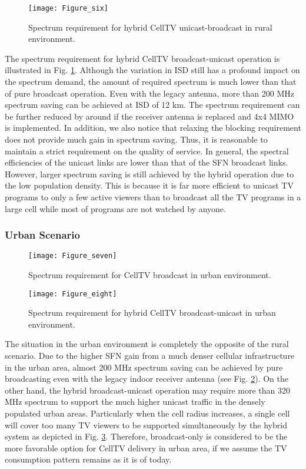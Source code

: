 \documentclass[journal]{IEEEtran}
\begin{document}
   \begin{figure}[t]
  \centering
  \texttt{[image: Figure\_six]}\\
  \caption{Spectrum requirement for hybrid CellTV unicast-broadcast in rural environment.}\label{fig:Hybrid_rural}
\end{figure}
The spectrum requirement for hybrid CellTV broadcast-unicast operation is illustrated in Fig. \ref{fig:Hybrid_rural}. Although the variation in ISD still has a profound impact on the spectrum demand, the amount of required spectrum is much lower than that of pure broadcast operation. Even with the legacy antenna, more than 200 MHz spectrum saving can be achieved at ISD of 12 km. The spectrum requirement can be further reduced by around  if the receiver antenna is replaced and 4x4 MIMO is implemented. In addition, we also notice that relaxing the blocking requirement does not provide much gain in spectrum saving. Thus, it is reasonable to maintain a strict requirement on the quality of service. In general, the spectral efficiencies of the unicast links are lower than that of the SFN broadcast links. However, larger spectrum saving is still achieved by the hybrid operation due to the low population density. This is because it is far more efficient to unicast TV programs to only a few active viewers than to broadcast all the TV programs in a large cell while most of programs are not watched by anyone.


\subsubsection{\textbf{Urban Scenario}}
  \begin{figure}[t]
  \centering
  \texttt{[image: Figure\_seven]}\\
  \caption{Spectrum requirement for CellTV broadcast in urban environment.}\label{fig:Broad_urban}
\end{figure}


   \begin{figure}[t]
  \centering
  \texttt{[image: Figure\_eight]}\\
  \caption{Spectrum requirement for hybrid CellTV broadcast-unicast in urban environment.}\label{fig:Hybrid_urban}
\end{figure}

The situation in the urban environment is completely the opposite of the rural scenario. Due to the higher SFN gain from a much denser cellular infrastructure in the urban area, almost 200 MHz spectrum saving can be achieved by pure broadcasting even with the legacy indoor receiver antenna (see Fig. \ref{fig:Broad_urban}). On the other hand, the hybrid broadcast-unicast operation may require more than 320 MHz spectrum to support the much higher unicast traffic in the densely populated urban areas. Particularly when the cell radius increases, a single cell will cover too many TV viewers to be supported simultaneously by the hybrid system as depicted in Fig. \ref{fig:Hybrid_urban}. Therefore, broadcast-only is considered to be the more favorable option for CellTV delivery in urban area, if we assume the TV consumption pattern remains as it is of today.
\end{document}

